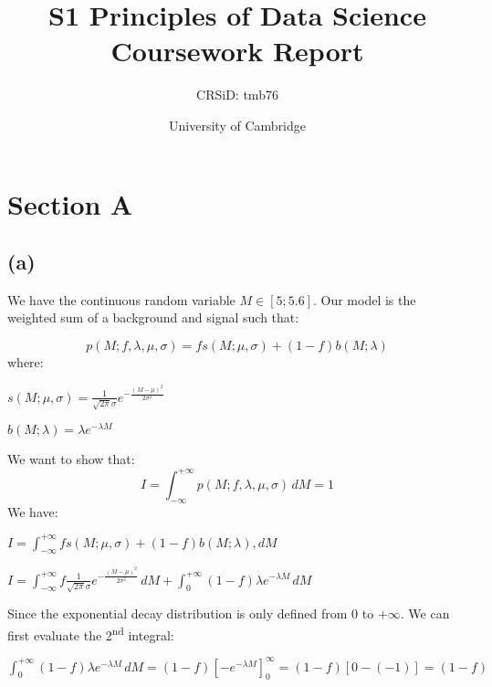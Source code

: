 \documentclass[12pt]{report} %
\title{S1 Principles of Data Science Coursework Report}
\author{CRSiD: tmb76}
\date{University of Cambridge}
\begin{document}
 

\maketitle

\section{Section A}

\subsection*{(a)}

We have the continuous random variable $M \in{[5;5.6]}$. Our model is the weighted sum of a background and signal such that:  


\begin{equation}
p(M;f,\lambda,\mu,\sigma) = fs(M;\mu,\sigma) + (1 - f)b(M;\lambda)
\end{equation}
where:
\begin{center}
$s(M;\mu,\sigma) = \frac{1}{\sqrt{2\pi}\sigma} e^{-\frac{{(M - \mu)}^{2}}{2\sigma^{2}}}$
\end{center}
\begin{center}
$b(M;\lambda) = \lambda e^{-\lambda M}$
\end{center}
\vspace{1\baselineskip}  
We want to show that:  
\begin{equation}
I = \int_{-\infty}^{+\infty} p(M;f,\lambda,\mu,\sigma)\, dM = 1
\end{equation}
We have:  

\vspace{1\baselineskip}  
$I = \displaystyle\int_{-\infty}^{+\infty} fs(M;\mu,\sigma) + (1-f)b(M;\lambda), dM$  

$I = \displaystyle\int_{-\infty}^{+\infty} f\frac{1}{\sqrt{2\pi}\sigma} e^{-\frac{{(M - \mu)}^{2}}{2\sigma^{2}}}\, dM +  \displaystyle\int_{0}^{+\infty} (1-f)\lambda e^{-\lambda M}\, dM$  

\vspace*{1\baselineskip}
Since the exponential decay distribution is only defined from 0 to $+\infty$. We can first evaluate the 2\textsuperscript{nd} integral:  

\vspace*{1\baselineskip}
$\displaystyle \int_{0}^{+\infty} (1-f)\lambda e^{-\lambda M}\, dM  =  (1-f){[-e^{-\lambda M}]}_{0}^{\infty}  =  (1-f)[0 - (-1)]  =  (1-f)$  
\end{document}
